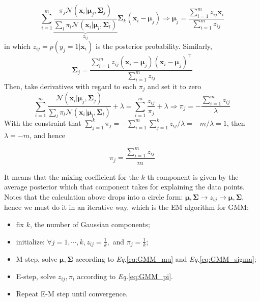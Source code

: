 \documentclass{article}
\begin{document}
	\begin{equation}
	\label{eq:GMM_mu}
	\sum_{i=1}^m \underbrace{\frac{\pi_j  \mathcal{N} (\bm{x}_i|\bm{\mu}_j,\bm{\Sigma}_j)}{\sum_l \pi_l \mathcal{N} (\bm{x}_i|\bm{\mu}_l,\bm{\Sigma}_l)}}_{z_{ij}} \bm{\Sigma}_k (\bm{x}_i - \bm{\mu}_j) \Longrightarrow \bm{\mu}_j=\frac{\sum_{i=1}^m z_{ij} \bm{x}_i}{\sum_{i=1}^m z_{ij}}
	\end{equation}
in which $z_{ij}=p(y_j=1|\bm{x}_i)$ is the posterior probability. Similarly,
	\begin{equation}
	\label{eq:GMM_sigma}
	\bm{\Sigma}_j=\frac{\sum_{i=1}^m z_{ij} (\bm{x}_i-\bm{\mu}_j)(\bm{x}_i-\bm{\mu}_j)^\top}{\sum_{i=1}^m z_{ij}}
	\end{equation}
	Then, take derivatives with regard to each $\pi_j$ and set it to zero
	\begin{equation*}
	\sum_{i=1}^m \frac{\mathcal{N} (\bm{x}_i|\bm{\mu}_j,\bm{\Sigma}_j) }{\sum_l \pi_l \mathcal{N} (\bm{x}_i|\bm{\mu}_l,\bm{\Sigma}_l)} + \lambda = \sum_{i=1}^m \frac{z_{ij}}{\pi_j} + \lambda \Longrightarrow \pi_j=-\frac{\sum_{i=1}^m z_{ij}}{\lambda}
	\end{equation*}
With the constraint that $\sum_{j=1}^k\pi_j=-\sum_{i=1}^m\sum_{j=1}^k z_{ij}/\lambda = -m/\lambda=1$, then $\lambda=-m$, and hence

	\begin{equation}
	\label{eq:GMM_pi}
	\pi_j=\frac{\sum_{i=1}^m z_{ij}}{m}
	\end{equation}
	
	It means that the mixing coefficient for the $k$-th component is given by the average posterior which that component takes for explaining the data points. Notes that the calculation above drops into a circle form: $\bm{\mu}, \bm{\Sigma} \rightarrow z_{ij} \rightarrow \bm{\mu}, \bm{\Sigma}$, hence we must do it in an iterative way, which is the EM algorithm for GMM:
	
	
	\begin{minipage}{.9\linewidth}
    \begin{itemize}
	\item fix $k$, the number of Gaussian components;
	\item initialize: $\forall j=1,\cdots,k, z_{ij}=\frac{1}{k},$ and $\pi_j=\frac{1}{k}$;
	\item M-step, solve $\bm{\mu}, \bm{\Sigma}$ according to \textit{Eq.}\ref{eq:GMM_mu} and \textit{Eq.}\ref{eq:GMM_sigma};
	\item E-step, solve $z_{ij},\pi_i$ according to \textit{Eq.}\ref{eq:GMM_pi}.
	\item Repeat E-M step until convergence.
	\end{itemize}
  	\end{minipage}
\end{document}
